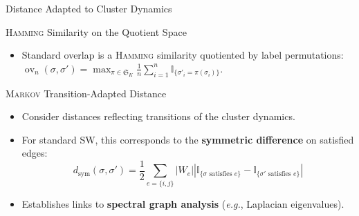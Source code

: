 \documentclass[A4,svgnames,9pt,aspectratio=169]{beamer}
\newcommand{\ov}{\operatorname{ov}}
\newcommand{\ind}[1]{\mathbb{I}_{\{#1\}}}
\begin{document}
\begin{frame}{Distance Adapted to Cluster Dynamics}
  \begin{block}{\textsc{Hamming} Similarity on the Quotient Space}
    \begin{itemize}
      \item Standard overlap is a \textsc{Hamming} similarity quotiented by label permutations:
        $\ov_n(\sigma, \sigma') = \max_{\pi \in \mathfrak{S}_K} \frac{1}{n} \sum_{i=1}^n \ind{\sigma'_i = \pi(\sigma_i)}$.
    \end{itemize}
  \end{block}

  \begin{block}{\textsc{Markov} Transition-Adapted Distance}
    \begin{itemize}
      \item Consider distances reflecting transitions of the cluster dynamics.
      \item For standard SW, this corresponds to the \textbf{symmetric difference} on satisfied edges:
        $$d_{\mathrm{sym}}(\sigma, \sigma') = \frac{1}{2} \sum_{e=\{i,j\}} |W_e| \left| \ind{\sigma \text{ satisfies } e} - \ind{\sigma' \text{ satisfies } e} \right|$$
      \item Establishes links to \textbf{spectral graph analysis} (\emph{e.g.}, Laplacian eigenvalues).
    \end{itemize}
  \end{block}
\end{frame}
\end{document}

